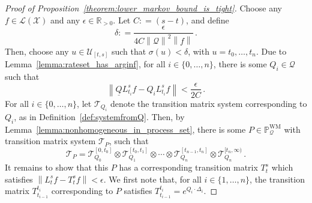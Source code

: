 \documentclass[10pt]{paper}
\theoremstyle{definition}
\newcommand{\reals}{\mathbb{R}}
\newcommand{\realspos}{\reals_{>0}}
\newcommand{\states}{\mathcal{X}}
\newcommand{\processes}{\mathbb{P}}
\newcommand{\wmprocesses}{\processes^{\mathrm{WM}}}
\newcommand{\gambles}{\mathcal{L}}
\newcommand{\gamblesX}{\gambles(\states)}
\newcommand{\rateset}{\mathcal{Q}}
\newcommand{\lrate}{\underline{Q}}
\newcommand{\norm}[1]{\left\lVert #1 \right\rVert}
\newcommand{\coloneqq}{:\!=}
\begin{document}
\begin{proof}[Proof of Proposition~\ref{theorem:lower_markov_bound_is_tight}]
Choose any $f\in\gamblesX$ and any $\epsilon\in\realspos$. Let $C\coloneqq (s-t)$, and define
\begin{equation}\label{eq:delta_required_for_tight_bound}
\delta \coloneqq \frac{\epsilon}{4C\norm{\mathcal{Q}}^2\norm{f}}\,.
\end{equation}
Then, choose any $u\in\mathcal{U}_{[t,s]}$ such that $\sigma(u)<\delta$, with $u=t_0,\ldots,t_n$. Due to Lemma~\ref{lemma:rateset_has_arginf}, for all $i\in\{0,\ldots,n\}$, there is some $Q_i\in\rateset$ such that
\begin{equation}\label{eq:prop_lower_markov_tight_rate_error}
\norm{\lrate L_{t_i}^sf - Q_iL_{t_i}^sf} < \frac{\epsilon}{2C}\,.
\end{equation}
For all $i\in\{0,\ldots,n\}$, let $\mathcal{T}_{Q_i}$ denote the transition matrix system corresponding to $Q_i$, as in Definition~\ref{def:systemfromQ}. Then, by Lemma~\ref{lemma:nonhomogeneous_in_process_set}, there is some $P\in\wmprocesses_\rateset$ with transition matrix system $\mathcal{T}_P$, such that
\begin{equation*}
\mathcal{T}_P = \mathcal{T}_{Q_0}^{[0,t_0]}\otimes \mathcal{T}_{Q_1}^{[t_0,t_1]}\otimes \cdots \otimes \mathcal{T}_{Q_n}^{[t_{n-1},t_n]} \otimes \mathcal{T}_{Q_n}^{[t_{n},\infty)}\,.
\end{equation*}
It remains to show that this $P$ has a corresponding transition matrix $T_t^s$ which satisfies $\norm{L_t^sf - T_t^sf} < \epsilon$. We first note that, for all $i\in\{1,\ldots,n\}$, the transition matrix $T_{t_{i-1}}^{t_i}$ corresponding to $P$ satisfies $T_{t_{i-1}}^{t_i} = e^{Q_i\cdot\Delta_i}$.


\end{proof}
\end{document}
